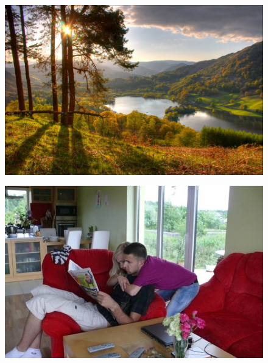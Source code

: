 \documentclass[10pt]{beamer}
\begin{document}
\begin{frame}{}
    \begin{figure}
        \centering
        \includegraphics[width=1.0\linewidth]{./img/beautiful_landscape.jpg}
    \end{figure}
\end{frame}

\begin{frame}{}
    \begin{figure}
        \centering
        \includegraphics[width=1.0\linewidth]{./img/confusing_image_4.jpg}
    \end{figure}
\end{frame}
\end{document}
